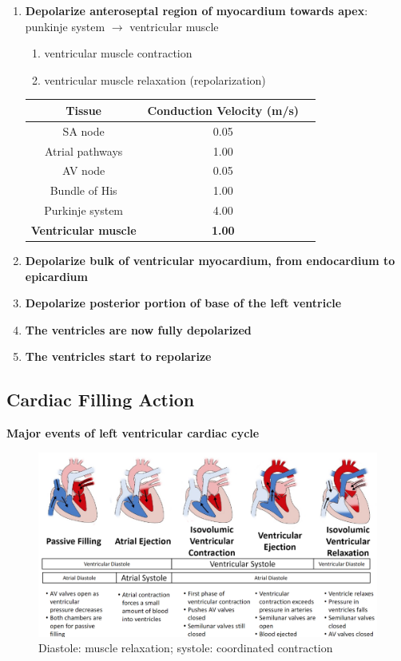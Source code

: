 \documentclass[11pt,fleqn]{book} %
\begin{document}
\begin{enumerate}
    \item \textbf{Depolarize anteroseptal
region of myocardium
towards apex}: punkinje system $\rightarrow$ ventricular muscle
    \begin{enumerate}[start=5]
        \item ventricular muscle contraction
        \item ventricular muscle relaxation (repolarization)
    \end{enumerate}
\begin{tabular}{ccc}
\textbf{Tissue}  & \textbf{Conduction Velocity (m/s)} \\
\hline
SA node                                  & 0.05 \\
Atrial pathways                          & 1.00 \\
AV node                                  & 0.05 \\
Bundle of His&1.00\\
Purkinje system&4.00\\
\textbf{Ventricular muscle}&\textbf{1.00}
\end{tabular}
    \item \textbf{Depolarize bulk of
ventricular myocardium,
from endocardium to
epicardium}
    \item \textbf{Depolarize posterior
portion of base of
the left ventricle}
    \item \textbf{The ventricles are
now fully depolarized}
    \item \textbf{The ventricles
start to repolarize}
\end{enumerate}

\subsection{Cardiac Filling Action}
\textbf{Major events of left ventricular cardiac cycle}
\begin{figure}[h!]
\begin{center}
    \includegraphics[width=1\linewidth]{Pictures/Screenshot 2024-04-04 001601.png}
    \caption{Diastole: muscle relaxation; systole: coordinated contraction}
\end{center}
\end{figure}
\end{document}
